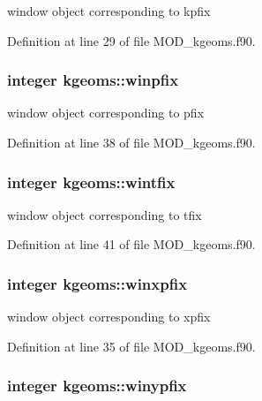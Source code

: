 window object corresponding to kpfix 



Definition at line 29 of file M\-O\-D\-\_\-kgeoms.\-f90.

\hypertarget{classkgeoms_aa76d85e89767ae6f676bdec36b9c940c}{
\subsubsection[{winpfix}]{\setlength{\rightskip}{0pt plus 5cm}integer kgeoms\-::winpfix}}\label{classkgeoms_aa76d85e89767ae6f676bdec36b9c940c}


window object corresponding to pfix 



Definition at line 38 of file M\-O\-D\-\_\-kgeoms.\-f90.

\hypertarget{classkgeoms_aeceb719263c6f11ed37a844c681c29c6}{
\subsubsection[{wintfix}]{\setlength{\rightskip}{0pt plus 5cm}integer kgeoms\-::wintfix}}\label{classkgeoms_aeceb719263c6f11ed37a844c681c29c6}


window object corresponding to tfix 



Definition at line 41 of file M\-O\-D\-\_\-kgeoms.\-f90.

\hypertarget{classkgeoms_ab2595aff393c09438e99c50c6b7e4000}{
\subsubsection[{winxpfix}]{\setlength{\rightskip}{0pt plus 5cm}integer kgeoms\-::winxpfix}}\label{classkgeoms_ab2595aff393c09438e99c50c6b7e4000}


window object corresponding to xpfix 



Definition at line 35 of file M\-O\-D\-\_\-kgeoms.\-f90.

\hypertarget{classkgeoms_a0a2ff7537ea5a9e2ecf83ede128a2582}{
\subsubsection[{winypfix}]{\setlength{\rightskip}{0pt plus 5cm}integer kgeoms\-::winypfix}}\label{classkgeoms_a0a2ff7537ea5a9e2ecf83ede128a2582}


